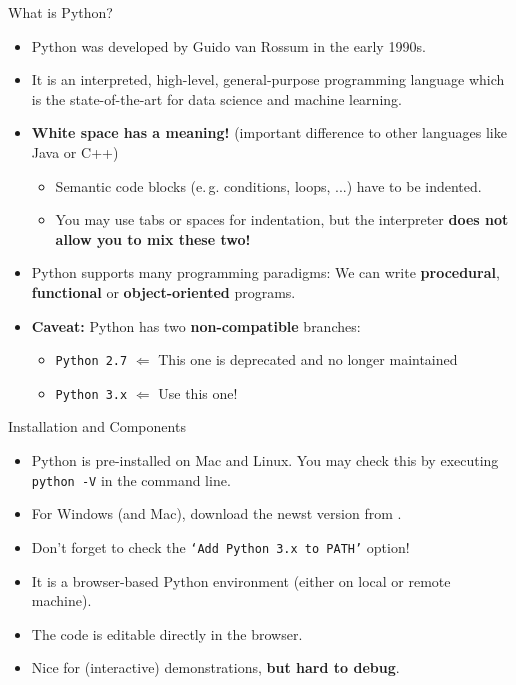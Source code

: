 \begin{dwHeaderFrame}{What is Python?}
	\begin{itemize}
		\item Python was developed by Guido van Rossum in the early 1990s.
		\item It is an interpreted, high-level, general-purpose programming language which is the state-of-the-art for data science and machine learning.
		\item \textbf{White space has a meaning!} (important difference to other languages like Java or C++)
		\begin{itemize}
			\item Semantic code blocks (e.\,g. conditions, loops, ...) have to be indented.
			\item You may use tabs or spaces for indentation, but the interpreter \textbf{does not allow you to mix these two!}
		\end{itemize}
		\item Python supports many programming paradigms: We can write \textbf{procedural}, \textbf{functional} or \textbf{object-oriented} programs.
	\end{itemize}
\end{dwHeaderFrame}


\begin{frame}
	\begin{itemize}
		\item \textbf{Caveat:} Python has two \textbf{non-compatible} branches:
		\begin{itemize}
			\item \texttt{Python 2.7} $\Longleftarrow$ This one is deprecated and no longer maintained
			\item \texttt{Python 3.x} $\Longleftarrow$ Use this one!
		\end{itemize}
	\end{itemize}
\end{frame}


\begin{dwHeaderFrame}{Installation and Components}
	\begin{itemize}
		\item Python is pre-installed on Mac and Linux. You may check this by executing \texttt{python -V} in the command line.
		\item For Windows (and Mac), download the newst version from .
		\item Don't forget to check the \texttt{`Add Python 3.x to PATH'} option!
	\end{itemize}
	\begin{itemize}
		\item It is a browser-based Python environment (either on local or remote machine).
		\item The code is editable directly in the browser.
		\item Nice for (interactive) demonstrations, \textbf{but hard to debug}.
	\end{itemize}
\end{dwHeaderFrame}


